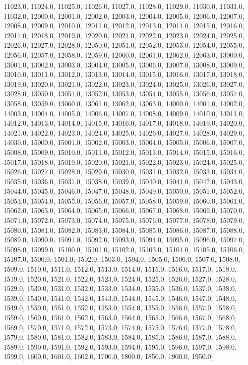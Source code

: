 11023.0, 11024.0, 11025.0, 11026.0, 11027.0, 11028.0, 11029.0, 11030.0, 11031.0, 11032.0, 12000.0, 12001.0, 12002.0, 12003.0, 12004.0, 12005.0, 12006.0, 12007.0, 12008.0, 12009.0, 12010.0, 12011.0, 12012.0, 12013.0, 12014.0, 12015.0, 12016.0, 12017.0, 12018.0, 12019.0, 12020.0, 12021.0, 12022.0, 12023.0, 12024.0, 12025.0, 12026.0, 12027.0, 12028.0, 12050.0, 12051.0, 12052.0, 12053.0, 12054.0, 12055.0, 12056.0, 12057.0, 12058.0, 12059.0, 12060.0, 12061.0, 12062.0, 12063.0, 13000.0, 13001.0, 13002.0, 13003.0, 13004.0, 13005.0, 13006.0, 13007.0, 13008.0, 13009.0, 13010.0, 13011.0, 13012.0, 13013.0, 13014.0, 13015.0, 13016.0, 13017.0, 13018.0, 13019.0, 13020.0, 13021.0, 13022.0, 13023.0, 13024.0, 13025.0, 13026.0, 13027.0, 13028.0, 13050.0, 13051.0, 13052.0, 13053.0, 13054.0, 13055.0, 13056.0, 13057.0, 13058.0, 13059.0, 13060.0, 13061.0, 13062.0, 13063.0, 14000.0, 14001.0, 14002.0, 14003.0, 14004.0, 14005.0, 14006.0, 14007.0, 14008.0, 14009.0, 14010.0, 14011.0, 14012.0, 14013.0, 14014.0, 14015.0, 14016.0, 14017.0, 14018.0, 14019.0, 14020.0, 14021.0, 14022.0, 14023.0, 14024.0, 14025.0, 14026.0, 14027.0, 14028.0, 14029.0, 14030.0, 15000.0, 15001.0, 15002.0, 15003.0, 15004.0, 15005.0, 15006.0, 15007.0, 15008.0, 15009.0, 15010.0, 15011.0, 15012.0, 15013.0, 15014.0, 15015.0, 15016.0, 15017.0, 15018.0, 15019.0, 15020.0, 15021.0, 15022.0, 15023.0, 15024.0, 15025.0, 15026.0, 15027.0, 15028.0, 15029.0, 15030.0, 15031.0, 15032.0, 15033.0, 15034.0, 15035.0, 15036.0, 15037.0, 15038.0, 15039.0, 15040.0, 15041.0, 15042.0, 15043.0, 15044.0, 15045.0, 15046.0, 15047.0, 15048.0, 15049.0, 15050.0, 15051.0, 15052.0, 15053.0, 15054.0, 15055.0, 15056.0, 15057.0, 15058.0, 15059.0, 15060.0, 15061.0, 15062.0, 15063.0, 15064.0, 15065.0, 15066.0, 15067.0, 15068.0, 15069.0, 15070.0, 15071.0, 15072.0, 15073.0, 15074.0, 15075.0, 15076.0, 15077.0, 15078.0, 15079.0, 15080.0, 15081.0, 15082.0, 15083.0, 15084.0, 15085.0, 15086.0, 15087.0, 15088.0, 15089.0, 15090.0, 15091.0, 15092.0, 15093.0, 15094.0, 15095.0, 15096.0, 15097.0, 15098.0, 15099.0, 15100.0, 15101.0, 15102.0, 15103.0, 15104.0, 15105.0, 15106.0, 15107.0, 1500.0, 1501.0, 1502.0, 1503.0, 1504.0, 1505.0, 1506.0, 1507.0, 1508.0, 1509.0, 1510.0, 1511.0, 1512.0, 1513.0, 1514.0, 1515.0, 1516.0, 1517.0, 1518.0, 1519.0, 1520.0, 1521.0, 1522.0, 1523.0, 1524.0, 1525.0, 1526.0, 1527.0, 1528.0, 1529.0, 1530.0, 1531.0, 1532.0, 1533.0, 1534.0, 1535.0, 1536.0, 1537.0, 1538.0, 1539.0, 1540.0, 1541.0, 1542.0, 1543.0, 1544.0, 1545.0, 1546.0, 1547.0, 1548.0, 1549.0, 1550.0, 1551.0, 1552.0, 1553.0, 1554.0, 1555.0, 1556.0, 1557.0, 1558.0, 1559.0, 1560.0, 1561.0, 1562.0, 1563.0, 1564.0, 1565.0, 1566.0, 1567.0, 1568.0, 1569.0, 1570.0, 1571.0, 1572.0, 1573.0, 1574.0, 1575.0, 1576.0, 1577.0, 1578.0, 1579.0, 1580.0, 1581.0, 1582.0, 1583.0, 1584.0, 1585.0, 1586.0, 1587.0, 1588.0, 1589.0, 1590.0, 1591.0, 1592.0, 1593.0, 1594.0, 1595.0, 1596.0, 1597.0, 1598.0, 1599.0, 1600.0, 1601.0, 1602.0, 1700.0, 1800.0, 1850.0, 1900.0, 1950.0]
